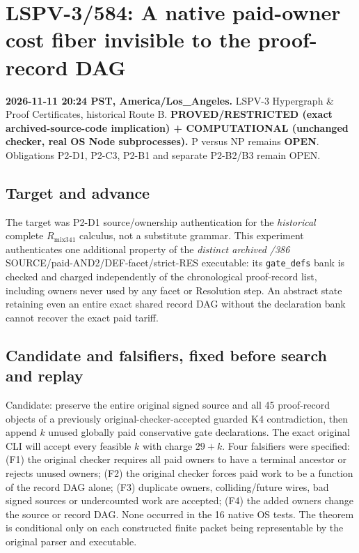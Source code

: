\documentclass[11pt]{article}
\begin{document}
\section*{LSPV-3/584: A native paid-owner cost fiber invisible to the proof-record DAG}
\noindent \textbf{2026-11-11 20:24 PST, America/Los\_Angeles.}
LSPV-3 Hypergraph \& Proof Certificates, historical Route B.
\textbf{PROVED/RESTRICTED (exact archived-source-code implication) + COMPUTATIONAL (unchanged checker, real OS Node subprocesses).}
P versus NP remains \textbf{OPEN}. Obligations P2-D1, P2-C3, P2-B1 and separate P2-B2/B3 remain OPEN.

\subsection*{Target and advance}
The target was P2-D1 source/ownership authentication for the \emph{historical} complete \(R_{\mathrm{mix341}}\) calculus, not a substitute grammar. This experiment authenticates one additional property of the \emph{distinct archived /386} SOURCE/paid-AND2/DEF-facet/strict-RES executable: its \texttt{gate\_defs} bank is checked and charged independently of the chronological proof-record list, including owners never used by any facet or Resolution step. An abstract state retaining even an entire exact shared record DAG without the declaration bank cannot recover the exact paid tariff.

\subsection*{Candidate and falsifiers, fixed before search and replay}
Candidate: preserve the entire original signed source and all 45 proof-record objects of a previously original-checker-accepted guarded K4 contradiction, then append \(k\) unused globally paid conservative gate declarations. The exact original CLI will accept every feasible \(k\) with charge \(29+k\). Four falsifiers were specified: (F1) the original checker requires all paid owners to have a terminal ancestor or rejects unused owners; (F2) the original checker forces paid work to be a function of the record DAG alone; (F3) duplicate owners, colliding/future wires, bad signed sources or undercounted work are accepted; (F4) the added owners change the source or record DAG. None occurred in the 16 native OS tests. The theorem is conditional only on each constructed finite packet being representable by the original parser and executable.
\end{document}
